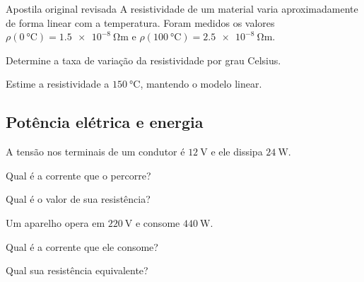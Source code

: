 \begin{questao}[3]{Apostila original revisada}
A resistividade de um material varia aproximadamente de forma linear com a
temperatura. Foram medidos os valores
$\rho(\SI{0}{\celsius})=\SI{1.5e-8}{\ohm\metre}$ e
$\rho(\SI{100}{\celsius})=\SI{2.5e-8}{\ohm\metre}$.
\begin{itensq}
\item Determine a taxa de variação da resistividade por grau Celsius.
\item Estime a resistividade a $\SI{150}{\celsius}$, mantendo o modelo linear.
\end{itensq}
\end{questao}




\subsection{Potência elétrica e energia}

\blocofixacao

\begin{questao}[1]{}
A tensão nos terminais de um condutor é $\SI{12}{\volt}$ e ele dissipa
$\SI{24}{\watt}$.
\begin{itensq}
\item Qual é a corrente que o percorre?
\item Qual é o valor de sua resistência?
\end{itensq}
\end{questao}

\begin{questao}[1]{}
Um aparelho opera em $\SI{220}{\volt}$ e consome $\SI{440}{\watt}$.
\begin{itensq}
\item Qual é a corrente que ele consome?
\item Qual sua resistência equivalente?
\end{itensq}
\end{questao}


